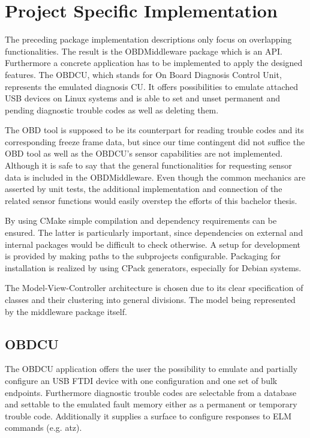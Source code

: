 

\chapter{Project Specific Implementation}

The preceding package implementation descriptions only focus on overlapping functionalities. 
The result is the OBDMiddleware package which is an API.
Furthermore a concrete application has to be implemented to apply the designed features.
The OBDCU, which stands for On Board Diagnosis Control Unit, represents the emulated diagnosis CU.
It offers possibilities to emulate attached USB devices on Linux systems and is able to set and unset
permanent and pending diagnostic trouble codes as well as deleting them.

The OBD tool is supposed to be its counterpart for reading trouble codes and its corresponding freeze frame data,
but since our time contingent did not suffice the OBD tool as well as the OBDCU’s sensor capabilities are not implemented. 
Although it is safe to say that the general functionalities for requesting sensor data is included in the OBDMiddleware. 
Even though the common mechanics are asserted by unit tests,
the additional implementation and connection of the related sensor functions would easily overstep the efforts of this bachelor thesis.

By using CMake simple compilation and dependency requirements can be ensured.
The latter is particularly important, since dependencies on external and internal packages would be difficult to check otherwise.
A setup for development is provided by making paths to the subprojects configurable. 
Packaging for installation is realized by using CPack generators, especially for Debian systems.

The Model-View-Controller architecture is chosen due to its clear specification of classes and their clustering into general divisions. 
The model being represented by the middleware package itself.

\section{OBDCU}

The OBDCU application offers the user the possibility to emulate and partially configure an USB FTDI device with one configuration
and one set of bulk endpoints. Furthermore diagnostic trouble codes are selectable from a database and settable to the emulated 
fault memory either as a permanent or temporary trouble code. 
Additionally it supplies a surface to configure responses to ELM commands (e.g. atz).

